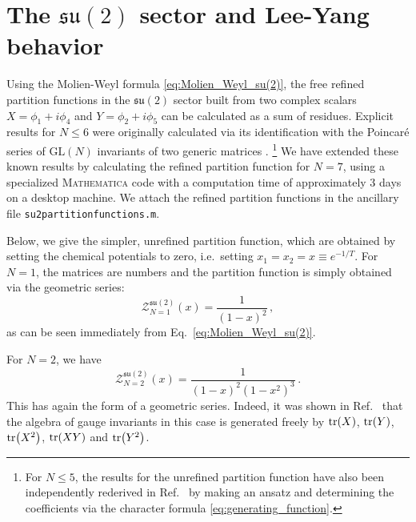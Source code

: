 \documentclass[a4paper,11pt]{article}
\begin{document}
\section{The \texorpdfstring{$\mathfrak{su}(2)$}{su(2)} sector and Lee-Yang behavior}
\label{sec: su(2) sector and Lee-Yang behavior}


Using the Molien-Weyl formula \eqref{eq:Molien_Weyl_su(2)}, the free refined partition functions in the $\mathfrak{su}(2)$ sector built from two complex scalars $X=\phi_1+i\phi_4$ and $Y=\phi_2+i\phi_5$ can be calculated as a sum of residues.
Explicit results for $N\leq 6$ were originally calculated via its identification with the Poincar\'e series of $\text{GL}(N)$ invariants of two generic matrices \cite{FORMANEK1981105,teranishi1986,teranishi1987,dhokovic2007}.%
\footnote{For $N\leq 5$, the results for the unrefined partition function have also been independently rederived in Ref.\ \cite{Harmark:2014mpa} by making an ansatz and determining the coefficients via the character formula \eqref{eq:generating_function}.}
We have extended these known results by calculating the refined partition function for $N=7$, using a specialized \textsc{Mathematica} code with a computation time of approximately 3 days on a desktop machine. We attach the refined partition functions in the ancillary file \texttt{su2partitionfunctions.m}. 

Below, we give the simpler, unrefined partition function, which are obtained by setting the chemical potentials to zero, i.e.\ setting $x_1 = x_2=x\equiv e^{-1/T}$.
For $N=1$, the matrices are numbers and the partition function is simply obtained via the geometric series:
\begin{equation}
	\mathcal{Z}^{\mathfrak{su}(2)}_{N=1}(x) = \frac{1}{(1-x)^2} \,,
\end{equation}
as can be seen immediately from Eq.\ \eqref{eq:Molien_Weyl_su(2)}.

For $N=2$, we have \cite{FORMANEK1981105}
\begin{equation}
	\mathcal{Z}^{\mathfrak{su}(2)}_{N=2}(x) = \frac{1}{(1-x)^2(1-x^2)^3} \,. 
\end{equation}
This has again the form of a geometric series. Indeed, it was shown in Ref.\ \cite{FORMANEK1981105} that the algebra of gauge invariants in this case is generated freely by $\tr(X)$, $\tr(Y)$, $\tr(X^2)$, $\tr(XY)$ and $\tr(Y^2)$. 
\end{document}
